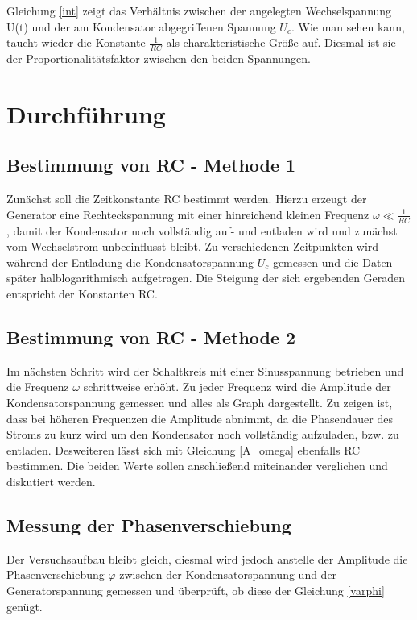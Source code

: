 Gleichung \eqref{int} zeigt das Verhältnis zwischen der angelegten Wechselspannung U(t) und der am Kondensator abgegriffenen Spannung $U_c$. 
Wie man sehen kann, taucht wieder die Konstante $\frac{1}{RC}$ als charakteristische Größe auf. Diesmal ist sie der Proportionalitätsfaktor zwischen den beiden Spannungen.\\

\section{Durchführung}
\subsection{Bestimmung von RC - Methode 1}
Zunächst soll die Zeitkonstante RC bestimmt werden. Hierzu erzeugt der Generator eine Rechteckspannung mit einer hinreichend kleinen Frequenz $\omega\ll\frac{1}{RC}$, damit der Kondensator noch vollständig auf- und entladen wird und zunächst vom Wechselstrom unbeeinflusst bleibt.
Zu verschiedenen Zeitpunkten wird während der Entladung die Kondensatorspannung $U_c$ gemessen und die Daten später halblogarithmisch aufgetragen. Die Steigung der sich ergebenden Geraden entspricht der Konstanten RC.

\subsection{Bestimmung von RC - Methode 2}
Im nächsten Schritt wird der Schaltkreis mit einer Sinusspannung betrieben und die Frequenz $\omega$ schrittweise erhöht. Zu jeder Frequenz wird die Amplitude der Kondensatorspannung gemessen und alles als Graph dargestellt. Zu zeigen ist, dass bei höheren Frequenzen die Amplitude abnimmt, da die Phasendauer des Stroms zu kurz wird um den Kondensator noch vollständig aufzuladen, bzw. zu entladen. Desweiteren lässt sich mit Gleichung \eqref{A_omega} ebenfalls RC bestimmen. Die beiden Werte sollen anschließend miteinander verglichen und diskutiert werden.

\subsection{Messung der Phasenverschiebung}
Der Versuchsaufbau bleibt gleich, diesmal wird jedoch anstelle der Amplitude die Phasenverschiebung $\varphi$ zwischen der Kondensatorspannung und der Generatorspannung gemessen und überprüft, ob diese der Gleichung \eqref{varphi} genügt.

